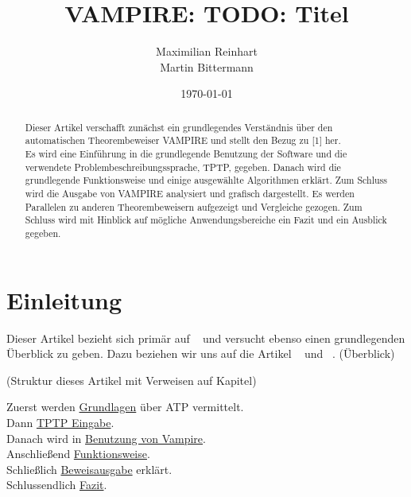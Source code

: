 \documentclass{acm_proc_article-sp-german}
\begin{document}
\title{VAMPIRE: TODO: Titel}
\author{
	\alignauthor
	Maximilian Reinhart\\
	\alignauthor
	Martin Bittermann\\
}

\date{\today}

\maketitle

\begin{abstract}

Dieser Artikel verschafft zunächst ein grundlegendes Verständnis über den automatischen Theorembeweiser VAMPIRE und
stellt den Bezug zu [1] her. \\
Es wird eine Einführung in die grundlegende Benutzung der Software und die verwendete Problembeschreibungssprache, TPTP, gegeben. 
Danach wird die grundlegende Funktionsweise und einige ausgewählte Algorithmen erklärt. 
Zum Schluss wird die Ausgabe von VAMPIRE analysiert und grafisch dargestellt.
Es werden Parallelen zu anderen Theorembeweisern aufgezeigt und Vergleiche gezogen.
Zum Schluss wird mit Hinblick auf mögliche Anwendungsbereiche ein Fazit und ein Ausblick gegeben.
\end{abstract}


\section{Einleitung}
\label{sec:introduction}


Dieser Artikel bezieht sich primär auf ~\cite{cav2013} und versucht ebenso einen grundlegenden Überblick zu geben.
Dazu beziehen wir uns auf die Artikel ~\cite{hoder2010} und ~\cite{kovacs2009finding}.
(Überblick) 

(Struktur dieses Artikel mit Verweisen auf Kapitel)

Zuerst werden \hyperref[sec:foundations]{Grundlagen} über ATP vermittelt.\\
Dann \hyperref[sec:input]{TPTP Eingabe}.\\
Danach wird in \hyperref[sec:invocation]{Benutzung von Vampire}.\\
Anschließend \hyperref[sec:mechanics]{Funktionsweise}.\\
Schließlich \hyperref[sec:output]{Beweisausgabe} erklärt.\\
Schlussendlich \hyperref[sec:conclusion]{Fazit}.
\end{document}

